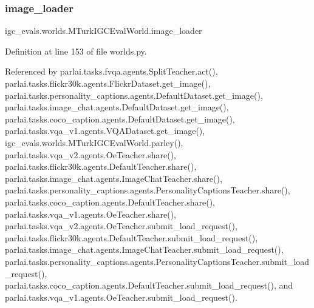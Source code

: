 \subsubsection{\texorpdfstring{image\+\_\+loader}{image\_loader}}
{\footnotesize\ttfamily igc\+\_\+evals.\+worlds.\+M\+Turk\+I\+G\+C\+Eval\+World.\+image\+\_\+loader}



Definition at line 153 of file worlds.\+py.



Referenced by parlai.\+tasks.\+fvqa.\+agents.\+Split\+Teacher.\+act(), parlai.\+tasks.\+flickr30k.\+agents.\+Flickr\+Dataset.\+get\+\_\+image(), parlai.\+tasks.\+personality\+\_\+captions.\+agents.\+Default\+Dataset.\+get\+\_\+image(), parlai.\+tasks.\+image\+\_\+chat.\+agents.\+Default\+Dataset.\+get\+\_\+image(), parlai.\+tasks.\+coco\+\_\+caption.\+agents.\+Default\+Dataset.\+get\+\_\+image(), parlai.\+tasks.\+vqa\+\_\+v1.\+agents.\+V\+Q\+A\+Dataset.\+get\+\_\+image(), igc\+\_\+evals.\+worlds.\+M\+Turk\+I\+G\+C\+Eval\+World.\+parley(), parlai.\+tasks.\+vqa\+\_\+v2.\+agents.\+Oe\+Teacher.\+share(), parlai.\+tasks.\+flickr30k.\+agents.\+Default\+Teacher.\+share(), parlai.\+tasks.\+image\+\_\+chat.\+agents.\+Image\+Chat\+Teacher.\+share(), parlai.\+tasks.\+personality\+\_\+captions.\+agents.\+Personality\+Captions\+Teacher.\+share(), parlai.\+tasks.\+coco\+\_\+caption.\+agents.\+Default\+Teacher.\+share(), parlai.\+tasks.\+vqa\+\_\+v1.\+agents.\+Oe\+Teacher.\+share(), parlai.\+tasks.\+vqa\+\_\+v2.\+agents.\+Oe\+Teacher.\+submit\+\_\+load\+\_\+request(), parlai.\+tasks.\+flickr30k.\+agents.\+Default\+Teacher.\+submit\+\_\+load\+\_\+request(), parlai.\+tasks.\+image\+\_\+chat.\+agents.\+Image\+Chat\+Teacher.\+submit\+\_\+load\+\_\+request(), parlai.\+tasks.\+personality\+\_\+captions.\+agents.\+Personality\+Captions\+Teacher.\+submit\+\_\+load\+\_\+request(), parlai.\+tasks.\+coco\+\_\+caption.\+agents.\+Default\+Teacher.\+submit\+\_\+load\+\_\+request(), and parlai.\+tasks.\+vqa\+\_\+v1.\+agents.\+Oe\+Teacher.\+submit\+\_\+load\+\_\+request().

\mbox{\label{classigc__evals_1_1worlds_1_1MTurkIGCEvalWorld_a3ef9075020f751d5e24f99c9f26007b3}} 
